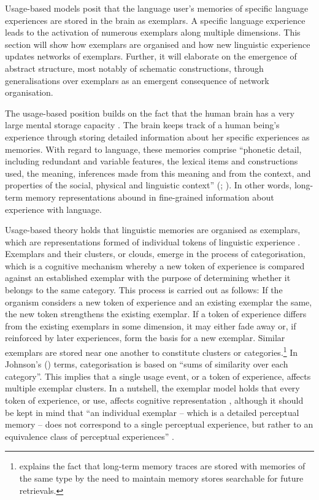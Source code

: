Usage-based models posit that the language user's memories of specific language experiences are stored in the brain as exemplars. A specific language experience leads to the activation of numerous exemplars along multiple dimensions. This section will show how exemplars are organised and how new linguistic experience updates networks of exemplars. Further, it will elaborate on the emergence of abstract structure, most notably of schematic constructions, through generalisations over exemplars as an emergent consequence of network organisation.

The usage-based position builds on the fact that the human brain has a very large mental storage capacity \citep[126]{sherwood-fundamentals-2012}. The brain keeps track of a human being's experience through storing detailed information about her specific experiences as memories. With regard to language, these memories comprise ``phonetic detail, including redundant and variable features, the lexical items and constructions used, the meaning, inferences made from this meaning and from the context, and properties of the social, physical and linguistic context'' (\citealt[14]{bybee-book-2010}; \citealt[cf.][]{langacker-foundations-1987,langacker00}). In other words, long-term memory representations abound in fine-grained information about experience with language.

Usage-based theory holds that linguistic memories are organised as exemplars, which are representations formed of individual tokens of linguistic experience \citep{johnson97, bybee-phonology-2001,bybee-book-2010,pierrehumbert-2001}. Exemplars and their clusters, or clouds, emerge in the process of categorisation, which is a cognitive mechanism whereby a new token of experience is compared against an established exemplar with the purpose of determining whether it belongs to the same category. This process is carried out as follows: If the organism considers a new token of experience and an existing exemplar the same, the new token strengthens the existing exemplar. If a token of experience differs from the existing exemplars in some dimension, it may either fade away or, if reinforced by later experiences, form the basis for a new exemplar. Similar exemplars are stored near one another to constitute clusters or categories.\footnote{\citet[127]{sherwood-fundamentals-2012} explains the fact that long-term memory traces are stored with memories of the same type by the need to maintain  memory stores searchable for future retrievals.} In Johnson's (\citeyear[][146]{johnson97}) terms, categorisation is based on ``sums of similarity over each category''. This implies that a single usage event, or a token of experience, affects multiple exemplar clusters. In a nutshell, the exemplar model holds that every token of experience, or use, affects cognitive representation \citep[cf.][]{bybee-beckner-2009}, although it should be kept in mind that ``an individual exemplar -- which is a detailed perceptual memory -- does not correspond to a single perceptual experience, but rather to an equivalence class of perceptual experiences'' \citep[141]{pierrehumbert-2001}. 


